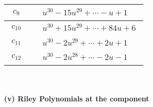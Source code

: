 \documentclass[1p]{elsarticle_modified}
\theoremstyle{definition}
\begin{document}
\begin{tabular}{m{50pt}|m{274pt}}
\hline $$\begin{aligned}c_{9}\end{aligned}$$&$\begin{aligned}
&u^{30}-15 u^{29}+\cdots- u+1
\end{aligned}$\\
\hline $$\begin{aligned}c_{10}\end{aligned}$$&$\begin{aligned}
&u^{30}+15 u^{29}+\cdots+84 u+6
\end{aligned}$\\
\hline $$\begin{aligned}c_{11}\end{aligned}$$&$\begin{aligned}
&u^{30}-2 u^{29}+\cdots+2 u+1
\end{aligned}$\\
\hline $$\begin{aligned}c_{12}\end{aligned}$$&$\begin{aligned}
&u^{30}-2 u^{28}+\cdots-2 u-1
\end{aligned}$\\
\hline
\end{tabular}\\~\\
\newpage\renewcommand{\arraystretch}{1}
\flushleft \textbf{(v) Riley Polynomials at the component}\newline \\
\end{document}
